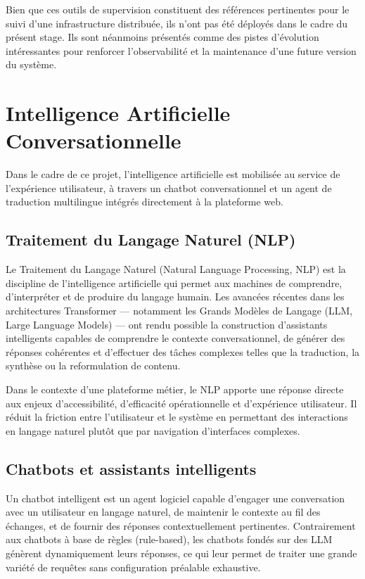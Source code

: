 Bien que ces outils de supervision constituent des références pertinentes pour le suivi d'une infrastructure distribuée, ils n'ont pas été déployés dans le cadre du présent stage. Ils sont néanmoins présentés comme des pistes d'évolution intéressantes pour renforcer l'observabilité et la maintenance d'une future version du système.

\section{Intelligence Artificielle Conversationnelle}
Dans le cadre de ce projet, l'intelligence artificielle est mobilisée au service de l'expérience utilisateur, à travers un chatbot conversationnel et un agent de traduction multilingue intégrés directement à la plateforme web.

\subsection{Traitement du Langage Naturel (NLP)}
Le Traitement du Langage Naturel (Natural Language Processing, NLP) est la discipline de l'intelligence artificielle qui permet aux machines de comprendre, d'interpréter et de produire du langage humain. Les avancées récentes dans les architectures Transformer \cite{whisper} — notamment les Grands Modèles de Langage (LLM, Large Language Models) — ont rendu possible la construction d'assistants intelligents capables de comprendre le contexte conversationnel, de générer des réponses cohérentes et d'effectuer des tâches complexes telles que la traduction, la synthèse ou la reformulation de contenu.

Dans le contexte d'une plateforme métier, le NLP apporte une réponse directe aux enjeux d'accessibilité, d'efficacité opérationnelle et d'expérience utilisateur. Il réduit la friction entre l'utilisateur et le système en permettant des interactions en langage naturel plutôt que par navigation d'interfaces complexes.

\subsection{Chatbots et assistants intelligents}
Un chatbot intelligent est un agent logiciel capable d'engager une conversation avec un utilisateur en langage naturel, de maintenir le contexte au fil des échanges, et de fournir des réponses contextuellement pertinentes. Contrairement aux chatbots à base de règles (rule-based), les chatbots fondés sur des LLM génèrent dynamiquement leurs réponses, ce qui leur permet de traiter une grande variété de requêtes sans configuration préalable exhaustive.

